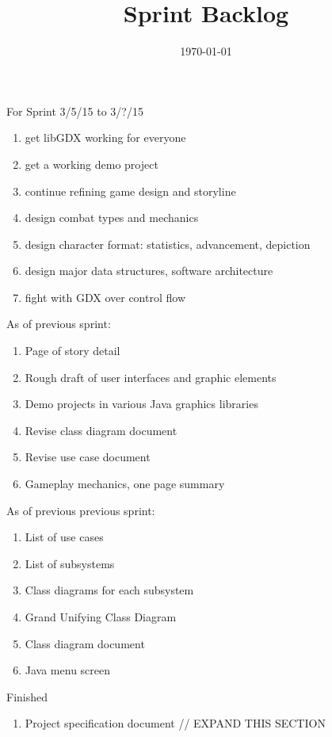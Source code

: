 \documentclass[12pt]{article}
\title{Sprint Backlog}
\date{\today}
\begin{document}
\maketitle

\begin{section}{For Sprint 3/5/15 to 3/?/15}
\begin{enumerate}

\item get libGDX working for everyone
\item get a working demo project

\item continue refining game design and storyline
\item design combat types and mechanics
\item design character format: statistics, advancement, depiction
\item design major data structures, software architecture

\item fight with GDX over control flow


\end{enumerate}
\end{section}


\begin{section}{As of previous sprint:}
\begin{enumerate}
\item Page of story detail
\item Rough draft of user interfaces and graphic elements
\item Demo projects in various Java graphics libraries
\item Revise class diagram document
\item Revise use case document
\item Gameplay mechanics, one page summary
\end{enumerate}
\end{section}

\begin{section}{As of previous previous sprint:}
\begin{enumerate}
\item List of use cases
\item List of subsystems
\item Class diagrams for each subsystem
\item Grand Unifying Class Diagram
\item Class diagram document
\item Java menu screen
\end{enumerate}
\end{section}

\begin{section}{Finished}
\begin{enumerate}
\item Project specification document
// EXPAND THIS SECTION
\end{enumerate}
\end{section}
\end{document}
